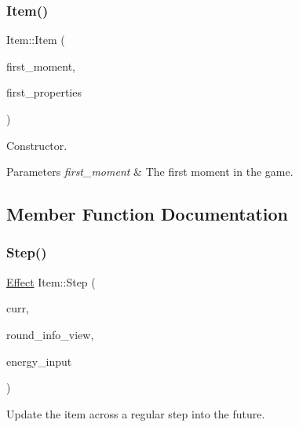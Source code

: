 \subsubsection{\texorpdfstring{Item()}{Item()}}
{\footnotesize\ttfamily Item\+::\+Item (\begin{DoxyParamCaption}\item[{\hyperlink{classtimeplane_1_1_moment}{Moment}}]{first\+\_\+moment,  }\item[{\hyperlink{classitem_1_1_item_properties}{Item\+Properties} const \&}]{first\+\_\+properties }\end{DoxyParamCaption})\hspace{0.3cm}{\ttfamily [protected]}}



Constructor. 


\begin{DoxyParams}{Parameters}
{\em first\+\_\+moment} & The first moment in the game. \\
\hline
\end{DoxyParams}


\subsection{Member Function Documentation}
\mbox{\label{classitem_1_1_item_ad8d77979820782fd86a0a67e2ea25c75}} 
\subsubsection{\texorpdfstring{Step()}{Step()}}
{\footnotesize\ttfamily \hyperlink{classitem_1_1_effect}{Effect} Item\+::\+Step (\begin{DoxyParamCaption}\item[{\hyperlink{classtimeplane_1_1_moment}{Moment}}]{curr,  }\item[{\hyperlink{classroundinfo_1_1_round_info_view}{Round\+Info\+View} const \&}]{round\+\_\+info\+\_\+view,  }\item[{int}]{energy\+\_\+input }\end{DoxyParamCaption})}



Update the item across a regular step into the future. 

